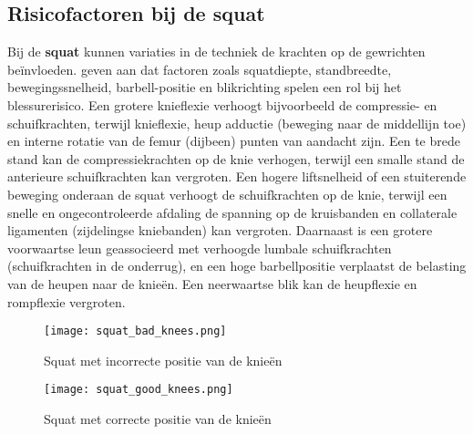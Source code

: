 \subsection{Risicofactoren bij de squat}
\label{subsec:risicofactoren-squat}
Bij de \textbf{squat} kunnen variaties in de techniek de krachten op de gewrichten beïnvloeden. 
\textcite{BengtssonEtAl2018} geven aan dat factoren zoals squatdiepte, standbreedte, bewegingssnelheid, barbell-positie en blikrichting spelen een rol bij het blessurerisico. 
Een grotere knieflexie verhoogt bijvoorbeeld de compressie- en schuifkrachten, terwijl knieflexie, heup adductie (beweging naar de middellijn toe) en interne rotatie van de femur (dijbeen) punten van aandacht zijn.
Een te brede stand kan de compressiekrachten op de knie verhogen, terwijl een smalle stand de anterieure schuifkrachten kan vergroten. 
Een hogere liftsnelheid of een stuiterende beweging onderaan de squat verhoogt de schuifkrachten op de knie, terwijl een snelle en ongecontroleerde afdaling de spanning op de kruisbanden en collaterale ligamenten (zijdelingse kniebanden) kan vergroten. 
Daarnaast is een grotere voorwaartse leun geassocieerd met verhoogde lumbale schuifkrachten (schuifkrachten in de onderrug), en een hoge barbellpositie verplaatst de belasting van de heupen naar de knieën. 
Een neerwaartse blik kan de heupflexie en rompflexie vergroten.

\begin{figure}[h]
  \centering
  \begin{minipage}{0.45\textwidth}
      \centering
      \texttt{[image: squat\_bad\_knees.png]}
      \caption[Squat met incorrecte positie van de knieën]{\label{fig:squat_incorrect}Squat met incorrecte positie van de knieën \autocite{CzaprowskiEtAl2012}}
  \end{minipage}
  \hfill %
  \begin{minipage}{0.45\textwidth}
      \centering
      \texttt{[image: squat\_good\_knees.png]}
      \caption[Squat met correcte positie van de knieën]{\label{fig:squat_correct}Squat met correcte positie van de knieën\autocite{ComfortEtAl2018}}
  \end{minipage}
\end{figure}

